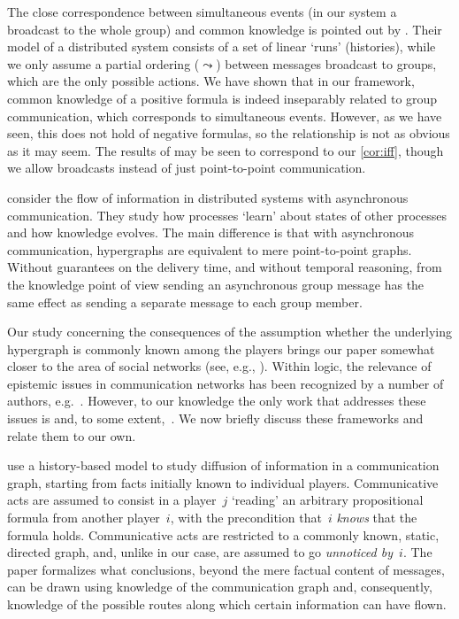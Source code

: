 \documentclass{article}
\newcounter{#1}
\begin{document}
The close correspondence between simultaneous events (in our system a
broadcast to the whole group) and common knowledge is pointed out by
\citet{FHMV99}. Their model of a distributed system consists of a
set of linear `runs' (histories), while we only assume a partial
ordering ($\leadsto$) between messages broadcast to groups, which are
the only possible actions.
We have shown that in our framework, common knowledge of a positive formula
is indeed inseparably related to group communication, which corresponds to simultaneous events.
However, as we have seen, this does not hold of negative formulas,
so the relationship is not as obvious as it may seem.
The results of \citet{FHMV99} may be seen to correspond to our \cref{cor:iff},
though we allow broadcasts instead of just point-to-point communication.

\citet{chandy_processes_1986} consider the flow of information
in distributed systems with asynchronous communication.
They study how processes `learn' about states of other processes and how knowledge evolves.
The main difference is that with asynchronous communication,
hypergraphs are equivalent to mere point-to-point graphs.
Without guarantees on the delivery time, and without temporal reasoning,
from the knowledge point of view
sending an asynchronous group message has the same effect as
sending a separate message to each group member.

Our study concerning the consequences of the assumption whether the underlying
hypergraph is commonly known among the players brings our paper
somewhat closer to the area of social networks
(see, e.g., \citet{Jac08}).
Within logic, the relevance of epistemic issues in communication networks
has been recognized by a number of authors, e.g.~\citet{van_benthem_one_2006_}.
However, to our knowledge the only work that addresses these issues
is \citet{pacuit_reasoning_2007} and, to some extent,~\citet{roelofsen_exploring_2005}.
We now briefly discuss these frameworks and relate them to our own.

 use a history-based model
to study diffusion of information in a communication graph,
starting from facts initially known to individual players.
Communicative acts are assumed to consist in
a player~$j$ `reading' an arbitrary propositional formula from another player~$i$,
with the precondition that~$i$ \emph{knows} that the formula holds.
Communicative acts are restricted to a commonly known, static, directed graph,
and, unlike in our case, are assumed to go \emph{unnoticed by~$i$}.
The paper formalizes what conclusions,
beyond the mere factual content of messages,
can be drawn using knowledge of the communication graph and, consequently,
knowledge of the possible routes along which certain information can have flown.
\end{document}
